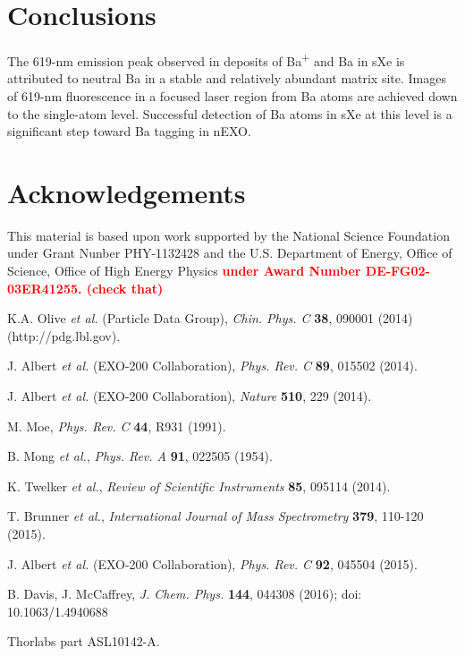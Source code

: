 \documentclass[aps,pra,reprint,superscriptaddress]{revtex4-1}
\begin{document}

\section{Conclusions}

The 619-nm emission peak observed in deposits of Ba\textsuperscript{+} and Ba in sXe is attributed to neutral Ba in a stable and relatively abundant matrix site.
Images of 619-nm fluorescence in a focused laser region from Ba atoms are achieved down to the single-atom level.  Successful detection of Ba atoms in sXe at this level is a significant step toward Ba tagging in nEXO. 

\section*{Acknowledgements}

This material is based upon work supported by the National Science Foundation under Grant Nunber PHY-1132428 and the U.S. Department of Energy, Office of Science, Office of High Energy Physics \textbf{\textcolor{red}{under Award Number DE-FG02-03ER41255. (check that)}}

%
\begin{thebibliography}{00}
  K.A. Olive \emph{et al.} (Particle Data Group), \emph{Chin. Phys. C} \textbf{38}, 090001 (2014) (http://pdg.lbl.gov).


 J. Albert \emph{et al.} (EXO-200 Collaboration), \emph{Phys. Rev. C} \textbf{89}, 015502 (2014).

 J. Albert \emph{et al.} (EXO-200 Collaboration), \emph{Nature} \textbf{510}, 229 (2014).

 M. Moe, \emph{Phys. Rev. C} \textbf{44}, R931 (1991).

 B. Mong \emph{ et al.}, \emph{Phys. Rev. A} \textbf{91}, 022505 (1954).

 K. Twelker \emph{ et al.}, \emph{Review of Scientific Instruments} \textbf{85}, 095114 (2014).

 T. Brunner \emph{ et al.}, \emph{International Journal of Mass Spectrometry} \textbf{379}, 110-120 (2015).

 J. Albert \emph{et al.} (EXO-200 Collaboration), \emph{Phys. Rev. C} \textbf{92}, 045504 (2015).

 B. Davis, J. McCaffrey, \emph{J. Chem. Phys.} \textbf{144}, 044308 (2016); doi: 10.1063/1.4940688

 Thorlabs part ASL10142-A.
\end{thebibliography}
\end{document}
